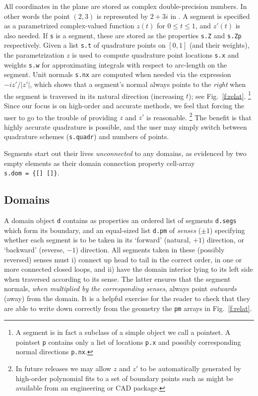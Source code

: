 \documentclass[12pt]{article}
\begin{document}
All coordinates in the plane are stored as complex double-precision
numbers. In other words the point 
$(2,3)$ is represented by $2+3i$ in \mpspack.
A segment is specified as a parametrized complex-valued
function $z(t)$ for $0\le t\le 1$, and $z'(t)$ is also needed.
If {\tt s} is a segment, these are stored as the properties
{\tt s.Z} and {\tt s.Zp} respectively.
Given a list {\tt s.t} of quadrature points on $[0,1]$
(and their weights),
the parametrization $z$ is used to compute quadrature point locations
{\tt s.x} and weights {\tt s.w}
for approximating integrals with respect to arc-length on the segment.
Unit normals {\tt s.nx} are computed when needed via the expression $-iz'/|z'|$,
which shows that a segment's normal always points to the {\em right}
when the segment is traversed in its natural direction (increasing $t$);
see Fig.~\ref{f:relat}.%
  \footnote{A segment is in fact a
    subclass of a simple object we call a pointset.
    A pointset {\tt p} contains only a list of locations {\tt p.x}
    and possibly corresponding normal directions {\tt p.nx}.}
Since our focus is on high-order and accurate methods,
we feel that forcing the user to go to the trouble of providing $z$ and $z'$
is reasonable.%
  \footnote{In future releases we may allow $z$ and $z'$ to be automatically
    generated by high-order polynomial fits to a set of boundary points such
    as might be available from an engineering or CAD package.}
The benefit is that highly accurate quadrature is possible, and
the user may simply switch between quadrature schemes ({\tt s.quadr})
and numbers of points.

Segments start out their lives {\em unconnected} to any domains,
as evidenced by two empty elements as their domain connection
property cell-array \\
\verb?s.dom = {[] []}?.

\subsection{Domains}

A domain object {\tt d} contains as properties
an ordered list of segments {\tt d.segs} which form its
boundary, and an equal-sized
list {\tt d.pm} of {\em senses} ($\pm1$)
specifying whether each segment is to be taken in its `forward'
(natural, $+1$) direction, or `backward' (reverse, $-1$) direction.
All segments taken in these (possibly reversed) senses must
i) connect up head to tail in the correct order,
in one or more connected closed loops,
and ii) have the domain interior lying to its left side when traversed
according to its sense.
The latter ensures that the segment normals, {\em when multiplied by the
corresponding senses}, always point {\em outwards} (away) from
the domain.
It is a helpful exercise for the reader to
check that they are able to write down correctly from the geometry
the {\tt pm} arrays in Fig.~\ref{f:relat}.
\end{document}
